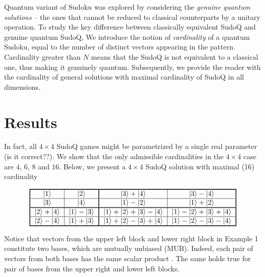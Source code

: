 \documentclass[11pt]{article}
\begin{document}
Quantum variant of Sudoku was explored by considering the \emph{genuine quantum solutions} – the ones that cannot be reduced to classical counterparts by a unitary operation. 
To study the key difference between classically equivalent SudoQ and genuine quantum SudoQ, We introduce the notion of \emph{cardinality} of a quantum Sudoku, equal to the number of distinct vectors appearing in the pattern. Cardinality greater than $N$ means that the SudoQ is not equivalent to a classical one, thus making it genuinely quantum. Subsequently, we provide the reader with the cardinality of general solutions with maximal cardinality of SudoQ in all dimensions. 


\section{Results}
In fact, all $4 \times 4$ SudoQ games might be parametrized by a single real parameter (is it correct??). 
We show that the only admissible cardinalities in the $4 \times 4$ case are $4$, $6$, $8$ and $16$.
Below, we present a $4 \times 4$ SudoQ solution with maximal (16) cardinality
\begin{example}{}\label{ex:4x4_card16}
\[
 \begin{tabular}{!{\vrule width 1pt}c|c!{\vrule width 1pt}c|c!{\vrule width 1pt}}
    \noalign{\hrule height 1pt}
    $\ket{1}$ & $\ket{2}$ & $\ket{3}+\ket{4}$ & $\ket{3}-\ket{4}$ \tabularnewline
    \hline
    $\ket{3}$ & $\ket{4}$ & $\ket{1}-\ket{2}$ & $\ket{1}+\ket{2}$ \tabularnewline
    \noalign{\hrule height 1pt}
    $\ket{2}+\ket{4}$ & $\ket{1}-\ket{3}$ & $\ket{1}+\ket{2}+\ket{3}-\ket{4}$ & $\ket{1}-\ket{2}+\ket{3}+\ket{4}$ \tabularnewline
    \hline
    $\ket{2}-\ket{4}$ & $\ket{1}+\ket{3}$ & $\ket{1}+\ket{2}-\ket{3}+\ket{4}$ & $\ket{1}-\ket{2}-\ket{3}-\ket{4}$ \tabularnewline
    \noalign{\hrule height 1pt}
\end{tabular}
\]
\end{example}

Notice that vectors from the upper left block and lower right block in Example 1 constitute two bases, which are mutually unbiased (MUB). Indeed, each pair of vectors from both bases has the same scalar product \cite{Ivonovic_1981,Wooters_1989}. The same holds true for pair of bases from the upper right and lower left blocks.
\end{document}
